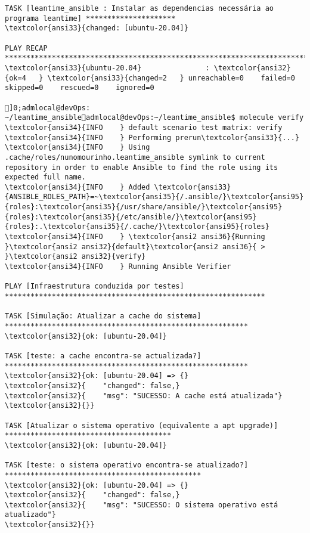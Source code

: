 \documentclass{scrartcl}
\begin{document}
\begin{Verbatim}
TASK [leantime_ansible : Instalar as dependencias necessária ao programa leantime] *********************
\textcolor{ansi33}{changed: [ubuntu-20.04]}

PLAY RECAP *********************************************************************************************
\textcolor{ansi33}{ubuntu-20.04}               : \textcolor{ansi32}{ok=4   } \textcolor{ansi33}{changed=2   } unreachable=0    failed=0    skipped=0    rescued=0    ignored=0

]0;admlocal@devOps: ~/leantime_ansibleadmlocal@devOps:~/leantime_ansible$ molecule verify
\textcolor{ansi34}{INFO    } default scenario test matrix: verify
\textcolor{ansi34}{INFO    } Performing prerun\textcolor{ansi33}{...}
\textcolor{ansi34}{INFO    } Using .cache/roles/nunomourinho.leantime_ansible symlink to current repository in order to enable Ansible to find the role using its expected full name.
\textcolor{ansi34}{INFO    } Added \textcolor{ansi33}{ANSIBLE_ROLES_PATH}=~\textcolor{ansi35}{/.ansible/}\textcolor{ansi95}{roles}:\textcolor{ansi35}{/usr/share/ansible/}\textcolor{ansi95}{roles}:\textcolor{ansi35}{/etc/ansible/}\textcolor{ansi95}{roles}:.\textcolor{ansi35}{/.cache/}\textcolor{ansi95}{roles}
\textcolor{ansi34}{INFO    } \textcolor{ansi2 ansi36}{Running }\textcolor{ansi2 ansi32}{default}\textcolor{ansi2 ansi36}{ > }\textcolor{ansi2 ansi32}{verify}
\textcolor{ansi34}{INFO    } Running Ansible Verifier

PLAY [Infraestrutura conduzida por testes] *************************************************************

TASK [Simulação: Atualizar a cache do sistema] *********************************************************
\textcolor{ansi32}{ok: [ubuntu-20.04]}

TASK [teste: a cache encontra-se actualizada?] *********************************************************
\textcolor{ansi32}{ok: [ubuntu-20.04] => {}
\textcolor{ansi32}{    "changed": false,}
\textcolor{ansi32}{    "msg": "SUCESSO: A cache está atualizada"}
\textcolor{ansi32}{}}

TASK [Atualizar o sistema operativo (equivalente a apt upgrade)] ***************************************
\textcolor{ansi32}{ok: [ubuntu-20.04]}

TASK [teste: o sistema operativo encontra-se atualizado?] **********************************************
\textcolor{ansi32}{ok: [ubuntu-20.04] => {}
\textcolor{ansi32}{    "changed": false,}
\textcolor{ansi32}{    "msg": "SUCESSO: O sistema operativo está atualizado"}
\textcolor{ansi32}{}}


\end{Verbatim}
\end{document}
